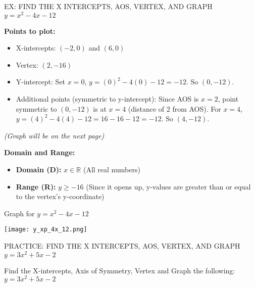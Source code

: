 \documentclass[aspectratio=169]{beamer}
\begin{document}
\begin{frame}{EX: FIND THE X INTERCEPTS, AOS, VERTEX, AND GRAPH $y = x^2 - 4x - 12$}
    \begin{tcolorbox}[colback=lightgray,colframe=primary,title=Graph - $y = x^2 - 4x - 12$]
        \footnotesize
        \textbf{Points to plot:}\
        \begin{itemize}
            \item X-intercepts: $(-2,0)$ and $(6,0)$
            \item Vertex: $(2, -16)$
            \item Y-intercept: Set $x=0$, $y = (0)^2 - 4(0) - 12 = -12$. So $(0,-12)$.
            \item Additional points (symmetric to y-intercept): Since AOS is $x=2$, point symmetric to $(0,-12)$ is at $x=4$ (distance of 2 from AOS). For $x=4$, $y = (4)^2 - 4(4) - 12 = 16 - 16 - 12 = -12$. So $(4,-12)$.
        \end{itemize}
        \vspace{0.5em}
        \textit{(Graph will be on the next page)}
        
        \textbf{Domain and Range:}\
        \begin{itemize}
            \item \textbf{Domain (D):} $x \in \mathbb{R}$ (All real numbers)
            \item \textbf{Range (R):} $y \ge -16$ (Since it opens up, y-values are greater than or equal to the vertex's y-coordinate)
        \end{itemize}
    \end{tcolorbox}
\end{frame}

\begin{frame}{Graph for $y = x^2 - 4x - 12$}
    \begin{tcolorbox}[colback=lightgray,colframe=primary,title=Visual Representation]
        \centering
        \texttt{[image: y\_xp\_4x\_12.png]}
    \end{tcolorbox}
\end{frame}

\begin{frame}{PRACTICE: FIND THE X INTERCEPTS, AOS, VERTEX, AND GRAPH $y = 3x^2 + 5x - 2$}
    \begin{tcolorbox}[colback=lightgray,colframe=primary,title=Problem]
        \footnotesize
        Find the X-intercepts, Axis of Symmetry, Vertex and Graph the following:\
        $y = 3x^2 + 5x - 2$
    \end{tcolorbox}
\end{frame}
\end{document}
